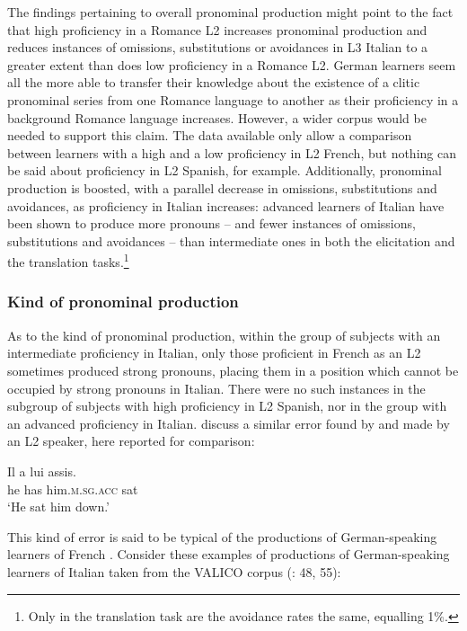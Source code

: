\documentclass[output=paper,modfonts,nonflat,newtxmath]{langsci/langscibook}
\begin{document}
The findings pertaining to overall pronominal production might point to the fact that high proficiency in a Romance L2 increases pronominal production and reduces instances of omissions, substitutions or avoidances in L3 Italian to a greater extent than does low proficiency in a Romance L2. German learners seem all the more able to transfer their knowledge about the existence of a clitic pronominal series from one Romance language to another as their proficiency in a background Romance language increases. However, a wider corpus would be needed to support this claim. The data available only allow a comparison between learners with a high and a low proficiency in L2 French, but nothing can be said about proficiency in L2 Spanish, for example. Additionally, pronominal production is boosted, with a parallel decrease in omissions, substitutions and avoidances, as proficiency in Italian increases: advanced learners of Italian have been shown to produce more pronouns – and fewer instances of omissions, substitutions and avoidances – than intermediate ones in both the elicitation and the translation tasks.\footnote{ \textrm{Only in the translation task are the avoidance rates the same, equalling 1\%.}}

\subsubsection{Kind {of} {pronominal} production} %

As to the kind of pronominal production, within the group of subjects with an intermediate proficiency in Italian, only those proficient in French as an L2 sometimes produced strong pronouns, placing them in a position which cannot be occupied by strong pronouns in Italian. There were no such instances in the subgroup of subjects with high proficiency in L2 Spanish, nor in the group with an advanced proficiency in Italian. \citet{HamannBelletti2006} discuss a similar error found by \citet[355]{GranfeldtSchlyter2004} and made by an L2 speaker, here reported for comparison:

\ea \label{ex:sciutti:37}
    \gll    Il a lui assis.\\
            he has him.\textsc{m.sg.acc} sat\\
    \glt  ‘He sat him down.’
\z%

This kind of error is said to be typical of the productions of German-speaking learners of French \citep{Herschensohn2004}. Consider these examples of productions of German-speaking learners of Italian taken from the VALICO corpus (\citealt{Corino2012}: 48, 55):
\end{document}

